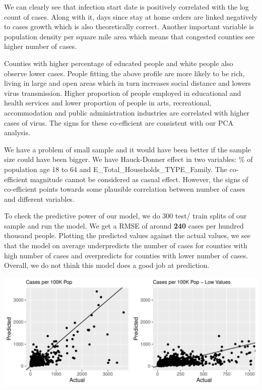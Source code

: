 \documentclass[
]{article}
\begin{document}
We can clearly see that infection start date is positively correlated
with the log count of cases. Along with it, days since stay at home
orders are linked negatively to cases growth which is also theoretically
correct. Another important variable is population density per square
mile area which means that congested counties see higher number of
cases.

Counties with higher percentage of educated people and white people also
observe lower cases. People fitting the above profile are more likely to
be rich, living in large and open areas which in turn increases social
distance and lowers virus transmission. Higher proportion of people
employed in educational and health services and lower proportion of
people in arts, recreational, accommodation and public administration
industries are correlated with higher cases of virus. The signs for
these co-efficient are consistent with our PCA analysis.

We have a problem of small sample and it would have been better if the
sample size could have been bigger. We have Hauck-Donner effect in two
variables: \% of population age 18 to 64 and
E\_Total\_Households\_TYPE\_Family. The co-efficient magnitude cannot be
considered as casual effect. However, the signs of co-efficient points
towards some plausible correlation between number of cases and different
variables.

To check the predictive power of our model, we do 300 test/ train splits
of our sample and run the model. We get a RMSE of around \textbf{240}
cases per hundred thousand people. Plotting the predicted values against
the actual values, we see that the model on average underpredicts the
number of cases for counties with high number of cases and overpredicts
for counties with lower number of cases. Overall, we do not think this
model does a good job at prediction.

\includegraphics{Final-Project-Covid-19_files/figure-latex/unnamed-chunk-9-1.pdf}
\end{document}

